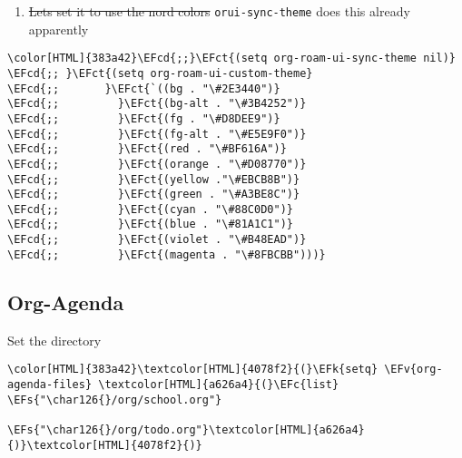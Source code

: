 \documentclass{scrartcl}
\newcommand{\EFk}[1]{\textcolor{EFk}{#1}} %
\newcommand{\EFs}[1]{\textcolor{EFs}{#1}} %
\newcommand{\EFct}[1]{\textcolor{EFct}{#1}} %
\newcommand{\EFc}[1]{\textcolor{EFc}{#1}} %
\newcommand{\EFv}[1]{\textcolor{EFv}{#1}} %
\newcommand{\EFcd}[1]{\textcolor{EFcd}{#1}} %
\begin{document}
\begin{enumerate}
\item \sout{Lets set it to use the nord colors} \texttt{orui-sync-theme} does this already apparently
\end{enumerate}
\begin{Code}
\begin{Verbatim}[]
\color[HTML]{383a42}\EFcd{;;}\EFct{(setq org-roam-ui-sync-theme nil)}
\EFcd{;; }\EFct{(setq org-roam-ui-custom-theme}
\EFcd{;;       }\EFct{`((bg . "\#2E3440")}
\EFcd{;;         }\EFct{(bg-alt . "\#3B4252")}
\EFcd{;;         }\EFct{(fg . "\#D8DEE9")}
\EFcd{;;         }\EFct{(fg-alt . "\#E5E9F0")}
\EFcd{;;         }\EFct{(red . "\#BF616A")}
\EFcd{;;         }\EFct{(orange . "\#D08770")}
\EFcd{;;         }\EFct{(yellow ."\#EBCB8B")}
\EFcd{;;         }\EFct{(green . "\#A3BE8C")}
\EFcd{;;         }\EFct{(cyan . "\#88C0D0")}
\EFcd{;;         }\EFct{(blue . "\#81A1C1")}
\EFcd{;;         }\EFct{(violet . "\#B48EAD")}
\EFcd{;;         }\EFct{(magenta . "\#8FBCBB")))}
\end{Verbatim}
\end{Code}

\subsection{Org-Agenda}
\label{sec:orgdf9ec52}
Set the directory
\begin{Code}
\begin{Verbatim}[]
\color[HTML]{383a42}\textcolor[HTML]{4078f2}{(}\EFk{setq} \EFv{org-agenda-files} \textcolor[HTML]{a626a4}{(}\EFc{list} \EFs{"\char126{}/org/school.org"}
                             \EFs{"\char126{}/org/todo.org"}\textcolor[HTML]{a626a4}{)}\textcolor[HTML]{4078f2}{)}
\end{Verbatim}
\end{Code}
\end{document}
